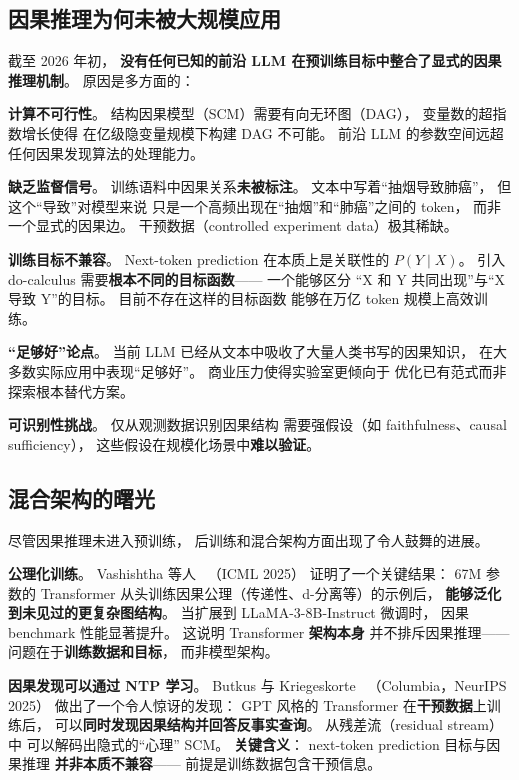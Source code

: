 \subsection{因果推理为何未被大规模应用}

截至 2026 年初，
\textbf{没有任何已知的前沿 LLM
在预训练目标中整合了显式的因果推理机制}。
原因是多方面的：

\textbf{计算不可行性}。
结构因果模型（SCM）需要有向无环图（DAG），
变量数的超指数增长使得
在亿级隐变量规模下构建 DAG 不可能。
前沿 LLM 的参数空间远超
任何因果发现算法的处理能力。

\textbf{缺乏监督信号}。
训练语料中因果关系\textbf{未被标注}。
文本中写着``抽烟导致肺癌''，
但这个``导致''对模型来说
只是一个高频出现在``抽烟''和``肺癌''之间的 token，
而非一个显式的因果边。
干预数据（controlled experiment data）极其稀缺。

\textbf{训练目标不兼容}。
Next-token prediction 在本质上是关联性的
$P(Y \mid X)$。
引入 do-calculus 需要\textbf{根本不同的目标函数}——
一个能够区分
``X 和 Y 共同出现''与``X 导致 Y''的目标。
目前不存在这样的目标函数
能够在万亿 token 规模上高效训练。

\textbf{``足够好''论点}。
当前 LLM 已经从文本中吸收了大量人类书写的因果知识，
在大多数实际应用中表现``足够好''。
商业压力使得实验室更倾向于
优化已有范式而非探索根本替代方案。

\textbf{可识别性挑战}。
仅从观测数据识别因果结构
需要强假设（如 faithfulness、causal sufficiency），
这些假设在规模化场景中\textbf{难以验证}。

\subsection{混合架构的曙光}

尽管因果推理未进入预训练，
后训练和混合架构方面出现了令人鼓舞的进展。

\textbf{公理化训练}。
Vashishtha 等人~\cite{vashishtha2025axiomatic}
（ICML 2025）
证明了一个关键结果：
67M 参数的 Transformer
从头训练因果公理（传递性、d-分离等）的示例后，
\textbf{能够泛化到未见过的更复杂图结构}。
当扩展到 LLaMA-3-8B-Instruct 微调时，
因果 benchmark 性能显著提升。
这说明 Transformer \textbf{架构本身}
并不排斥因果推理——
问题在于\textbf{训练数据和目标}，
而非模型架构。

\textbf{因果发现可以通过 NTP 学习}。
Butkus 与 Kriegeskorte~\cite{butkus2026causaldiscovery}
（Columbia，NeurIPS 2025）
做出了一个令人惊讶的发现：
GPT 风格的 Transformer
在\textbf{干预数据}上训练后，
可以\textbf{同时发现因果结构并回答反事实查询}。
从残差流（residual stream）中
可以解码出隐式的``心理'' SCM。
\textbf{关键含义}：
next-token prediction 目标与因果推理
\textbf{并非本质不兼容}——
前提是训练数据包含干预信息。

